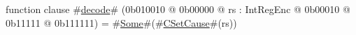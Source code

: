 function clause #\hyperref[sailMIPSzdecode]{decode}# (0b010010 @ 0b00000 @ rs : IntRegEnc @    0b00010 @    0b11111 @ 0b111111) = #\hyperref[sailMIPSzSome]{Some}#(#\hyperref[sailMIPSzCSetCause]{CSetCause}#(rs))
